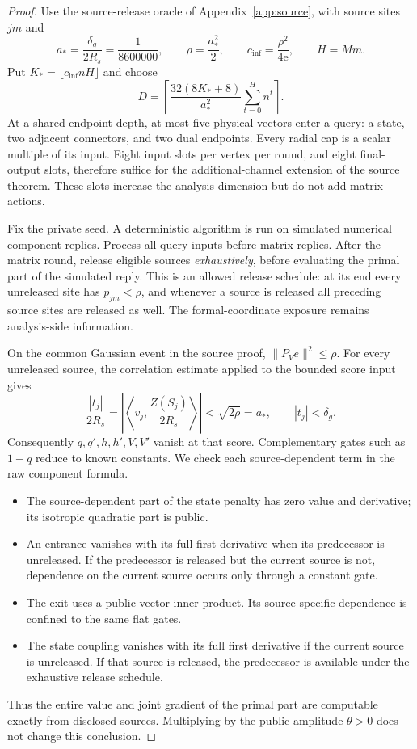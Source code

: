 \documentclass[11pt,letterpaper]{article}
\theoremstyle{definition}
\theoremstyle{remark}
\begin{document}
\begin{proof}
Use the source-release oracle of Appendix~\ref{app:source}, with source
sites $jm$ and
\begin{equation}
 a_* =\frac{\delta_g}{2R_s}=\frac1{8600000},\qquad
 \rho=\frac{a_*^2}{2},\qquad
 c_{\mathrm{inf}}=\frac{\rho^2}{4\mathrm e},\qquad H=Mm.
 \label{eq:information-constants}
\end{equation}
Put $K_* =\lfloor c_{\mathrm{inf}}nH\rfloor$ and choose
\begin{equation}
 D=\left\lceil\frac{32(8K_*+8)}{a_*^2}
                    \sum_{t=0}^{H}n^t\right\rceil.
 \label{eq:optimization-dimension}
\end{equation}
At a shared endpoint depth, at most five physical vectors enter a query:
a state, two adjacent connectors, and two dual endpoints. Every radial cap
is a scalar multiple of its input. Eight input slots per vertex per round,
and eight final-output slots, therefore suffice for the additional-channel
extension of the source theorem. These slots increase the analysis
dimension but do not add matrix actions.

Fix the private seed. A deterministic algorithm is run on simulated
numerical component replies. Process all query inputs before matrix replies.
After the matrix round, release eligible sources \emph{exhaustively}, before
evaluating the primal part of the simulated reply. This is an allowed
release schedule: at its end every unreleased site has $p_{jm}<\rho$, and
whenever a source is released all preceding source sites are released as
well. The formal-coordinate exposure remains analysis-side information.

On the common Gaussian event in the source proof,
$\|P_Ve\|^2\le\rho$. For every unreleased source, the correlation estimate
applied to the bounded score input gives
\[
 \frac{|t_j|}{2R_s}
 =\left|\left\langle v_j,\frac{Z(S_j)}{2R_s}\right\rangle\right|
 <\sqrt{2\rho}=a_*,
 \qquad |t_j|<\delta_g.
\]
Consequently $q,q',h,h',V,V'$ vanish at that score. Complementary gates
such as $1-q$ reduce to known constants. We check each source-dependent
term in the raw component formula.
\begin{itemize}
 \item The source-dependent part of the state penalty has zero value and
 derivative; its isotropic quadratic part is public.
 \item An entrance vanishes with its full first derivative when its
 predecessor is unreleased. If the predecessor is released but the current
 source is not, dependence on the current source occurs only through a
 constant gate.
 \item The exit uses a public vector inner product. Its source-specific
 dependence is confined to the same flat gates.
 \item The state coupling vanishes with its full first derivative if the
 current source is unreleased. If that source is released, the predecessor
 is available under the exhaustive release schedule.
\end{itemize}
Thus the entire value and joint gradient of the primal part are computable
exactly from disclosed sources. Multiplying by the public amplitude
$\theta>0$ does not change this conclusion.


\end{proof}
\end{document}
